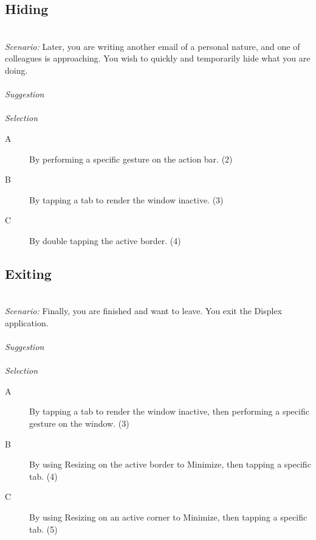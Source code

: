 \subsection{Hiding}
\hfill\\
\emph{Scenario:}
Later, you are writing another email of a personal nature, and one of colleagues is approaching. You wish to quickly and temporarily hide what you are doing.
\\\\
\emph{Suggestion}
\\\\
\emph{Selection}
\begin{description}
\item[A]{By performing a specific gesture on the action bar. (2)}
\item[B]{By tapping a tab to render the window inactive. (3)}
\item[C]{By double tapping the active border. (4)}
\end{description}


\subsection{Exiting}
\hfill\\
\emph{Scenario:}
Finally, you are finished and want to leave. You exit the Displex application.
\\\\
\emph{Suggestion}
\\\\
\emph{Selection}
\begin{description}
\item[A]{By tapping a tab to render the window inactive, then performing a specific gesture on the window. (3)}
\item[B]{By using Resizing on the active border to Minimize, then tapping a specific tab. (4)}
\item[C]{By using Resizing on an active corner to Minimize, then tapping a specific tab. (5)}
\end{description}

  

